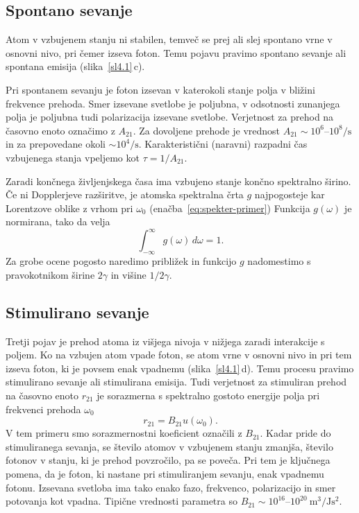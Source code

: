 \subsection*{Spontano sevanje}
Atom v vzbujenem stanju ni stabilen, temveč se prej ali slej spontano vrne 
v osnovni nivo, pri čemer izseva foton. Temu pojavu pravimo spontano sevanje 
ali spontana emisija (slika~\ref{sl4.1}\,c).

Pri spontanem sevanju je foton izsevan v katerokoli stanje polja v bližini 
frekvence prehoda. Smer izsevane svetlobe je poljubna, v odsotnosti zunanjega polja
je poljubna tudi polarizacija izsevane svetlobe.
Verjetnost za prehod na časovno enoto označimo z $A_{21}$.
Za dovoljene prehode je vrednost $A_{21} \sim 10^6$--$10^8/\si{\second}$ in 
za prepovedane okoli $\sim 10^4/\si{\second}$. Karakteristični (naravni) 
razpadni čas vzbujenega stanja vpeljemo kot
$\tau = 1/A_{21}$. 

Zaradi končnega življenjskega časa ima vzbujeno stanje končno spektralno 
širino. Če ni Dop\-pler\-je\-ve razširitve, je atomska spektralna 
črta $g$  najpogosteje kar 
Lorentzove oblike z vrhom pri $\omega_0$
(enačba~\ref{eq:spekter-primer})
Funkcija $g(\omega)$ je normirana, tako da velja
\begin{equation}
\int_{-\infty}^\infty g(\omega)\, d\omega=1.
\label{4.20}
\end{equation}
Za grobe ocene pogosto naredimo približek in funkcijo $g$ nadomestimo 
s pravokotnikom širine
$2\gamma$ in višine $1/2\gamma$.

\subsection*{Stimulirano sevanje}
Tretji pojav je prehod atoma iz višjega nivoja v nižjega zaradi interakcije
s poljem. Ko na vzbujen atom vpade foton, se atom vrne v osnovni nivo in pri 
tem izseva foton, ki je povsem enak vpadnemu (slika~\ref{sl4.1}\,d). 
Temu procesu pravimo stimulirano sevanje ali 
stimulirana emisija. Tudi verjetnost za stimuliran prehod na časovno enoto $r_{21}$ 
je sorazmerna s spektralno gostoto energije polja pri frekvenci prehoda $\omega_{0}$
\begin{equation}
r_{21}=B_{21}u(\omega_{0}).
\label{4.17}
\end{equation}
V tem primeru smo sorazmernostni koeficient označili z $B_{21}$. Kadar pride do
stimuliranega sevanja, se število atomov v vzbujenem stanju zmanjša, 
število fotonov v stanju, ki je prehod povzročilo, pa se poveča. Pri tem je 
ključnega pomena, da je foton, ki nastane pri stimuliranjem sevanju, enak vpadnemu fotonu.
Izsevana svetloba ima tako enako fazo, frekvenco, polarizacijo in smer potovanja kot 
vpadna. Tipične vrednosti parametra so $B_{21} \sim 10^{16}$--$10^{20}~\si{\metre^3/\joule\second^2}$.

